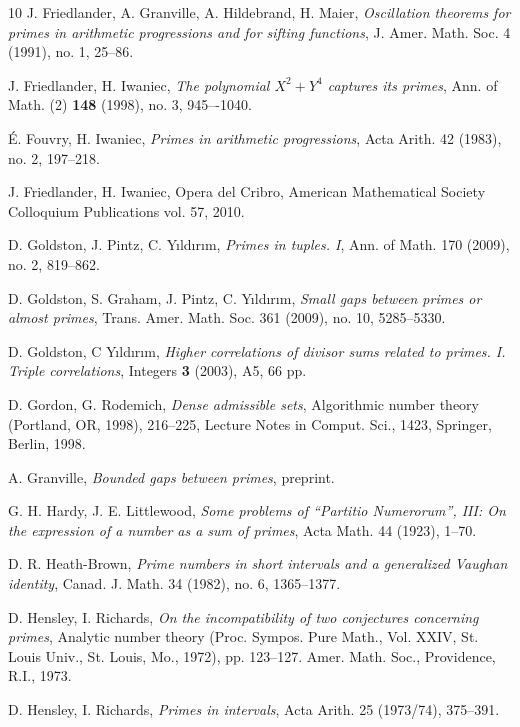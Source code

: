 \begin{thebibliography}{10}
  J. Friedlander, A. Granville, A. Hildebrand, H. Maier,
   \emph{Oscillation theorems for primes in arithmetic progressions
     and for sifting functions}, J. Amer. Math. Soc. 4 (1991), no. 1,
   25--86.

J. Friedlander, H. Iwaniec, \emph{The polynomial $X^2+Y^4$ captures its primes}, Ann. of Math. (2) \textbf{148} (1998), no. 3, 945–-1040.

 \'E. Fouvry, H. Iwaniec, \emph{Primes in arithmetic
    progressions}, Acta Arith. 42 (1983), no. 2, 197--218.
	
J. Friedlander, H. Iwaniec, Opera del Cribro, American Mathematical Society Colloquium Publications vol. 57, 2010.		

  D. Goldston, J. Pintz, C. Y{\i}ld{\i}r{\i}m,
   \emph{Primes in tuples. I}, Ann. of Math. 170 (2009),
   no. 2, 819--862.

  D. Goldston, S. Graham, J. Pintz,
   C. Y{\i}ld{\i}r{\i}m, \emph{Small gaps between primes or almost
     primes}, Trans. Amer. Math. Soc. 361 (2009), no. 10,
   5285--5330.

D. Goldston, C Y{\i}ld{\i}r{\i}m, \emph{Higher correlations of divisor sums related to primes. I. Triple correlations}, Integers \textbf{3} (2003), A5, 66 pp.

  D. Gordon, G. Rodemich, \emph{Dense admissible
     sets}, Algorithmic number theory (Portland, OR, 1998), 216--225,
   Lecture Notes in Comput. Sci., 1423, Springer, Berlin, 1998.
 
  A. Granville, \emph{Bounded gaps between primes},
   preprint.

  G. H. Hardy, J. E. Littlewood, \emph{Some problems of
     ``Partitio Numerorum'', III: On the expression of a number as a
     sum of primes}, Acta Math. 44 (1923), 1--70.

  D. R. Heath-Brown, \emph{Prime numbers in short
     intervals and a generalized Vaughan identity}, Canad. J. Math. 34
   (1982), no. 6, 1365--1377.

  D. Hensley, I. Richards, \emph{On the
     incompatibility of two conjectures concerning primes}, Analytic
   number theory (Proc. Sympos. Pure Math., Vol. XXIV, St. Louis
   Univ., St. Louis, Mo., 1972), pp. 123--127. Amer. Math. Soc.,
   Providence, R.I., 1973.

  D. Hensley, I. Richards, \emph{Primes in
     intervals}, Acta Arith. 25 (1973/74), 375--391.



\end{thebibliography}
